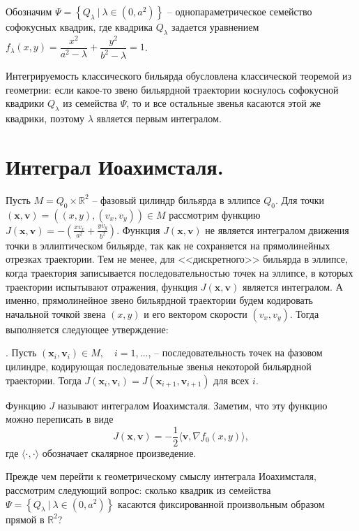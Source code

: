 Обозначим $\Psi = \left\{ Q_{\lambda} \ |\ \lambda \in (0, a^2) \right\}$ -- однопараметрическое семейство софокусных квадрик, где квадрика $Q_\lambda$ задается уравнением 
$f_\lambda(x,y)=\dfrac{x^2}{a^2-\lambda} + \dfrac{y^2}{b^2-\lambda} = 1$.

Интегрируемость классического бильярда обусловлена классической теоремой из геометрии: если какое-то звено бильярдной траектории коснулось софокусной квадрики $Q_\lambda$ из семейства $\Psi$, то и все остальные звенья касаются этой же квадрики, поэтому $\lambda$ является первым интегралом.


\section{Интеграл Иоахимсталя.}\label{sec:ch3/formatted-numbers}
Пусть $M = Q_0 \times \mathbb{R}^2$ -- фазовый цилиндр бильярда в эллипсе $Q_0$. Для точки $(\mathbf{x}, \mathbf{v}) = ((x,y), (v_x, v_y)) \in M$ рассмотрим функцию $J(\mathbf{x}, \mathbf{v}) = -\left(
\frac{x v_x}{a^2} + \frac{y v_y}{b^2} \right).$
Функция $J(\mathbf{x}, \mathbf{v})$ не является интегралом движения точки в эллиптическом бильярде, так как не сохраняется на прямолинейных отрезках траектории. Тем не менее, для <<дискретного>> бильярда в эллипсе, когда траектория записывается последовательностью точек на эллипсе, в которых траектории испытывают отражения, функция $J(\mathbf{x}, \mathbf{v})$ является интегралом. А именно, прямолинейное звено бильярдной траектории будем кодировать начальной точкой звена $(x, y)$ и его вектором скорости $(v_x, v_y)$. Тогда выполняется следующее утверждение: 

\begin{theorem}{\normalfont{[7, с.~61]}}.
Пусть $(\mathbf{x}_i, \mathbf{v}_i) \in M, \quad i=1,\ldots$, -- последовательность точек на фазовом цилиндре, кодирующая последовательные звенья некоторой  бильярдной траектории. Тогда $J(\mathbf{x}_i, \mathbf{v}_i) =  J(\mathbf{x}_{i+1}, \mathbf{v}_{i+1})$ для всех $i$.
\label{th:sect3_th1}
\end{theorem}

Функцию $J$ называют интегралом Иоахимсталя. Заметим, что эту функцию можно переписать в виде 
$$J(\mathbf{x}, \mathbf{v}) = -\frac{1}{2}\langle\mathbf{v}, \nabla f_0(x, y)\rangle,$$
где $\langle\cdot, \cdot\rangle$ обозначает скалярное произведение. 

Прежде чем перейти к геометрическому смыслу интеграла Иоахимсталя, рассмотрим следующий вопрос: сколько квадрик из семейства $\Psi = \left\{ Q_{\lambda} \ |\ \lambda \in (0, a^2) \right\}$ касаются   фиксированной произвольным образом прямой в $\mathbb{R}^2$?


